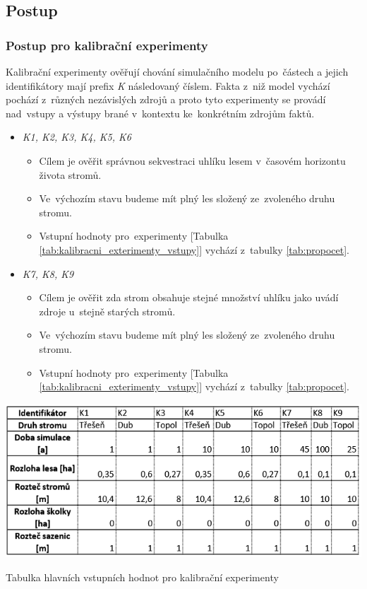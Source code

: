 \documentclass[a4paper, 11pt, titlepage]{article}
\begin{document}
\subsection{Postup}

\subsubsection{Postup pro kalibrační experimenty}

Kalibrační experimenty ověřují chování simulačního modelu po~částech a jejich identifikátory mají prefix \textit{K} následovaný číslem. 
Fakta z~niž model vychází pochází z~různých nezávislých zdrojů a proto tyto experimenty se provádí nad~vstupy a výstupy brané v~kontextu ke~konkrétním zdrojům faktů.
\begin{itemize}
    \item \textit{K1, K2, K3, K4, K5, K6}
    \begin{itemize}
        \item Cílem je ověřit správnou sekvestraci uhlíku lesem v~časovém horizontu života stromů.
        \item Ve~výchozím stavu budeme mít plný les složený ze~zvoleného druhu stromu.
        \item Vstupní hodnoty pro~experimenty [Tabulka \ref{tab:kalibracni_exterimenty_vstupy}] vychází z~tabulky \ref{tab:propocet}.
    \end{itemize}
    \item \textit{K7, K8, K9}
    \begin{itemize}
        \item Cílem je ověřit zda strom obsahuje stejné množství uhlíku jako uvádí zdroje u~stejně starých stromů.
        \item Ve~výchozím stavu budeme mít plný les složený ze~zvoleného druhu stromu.
        \item Vstupní hodnoty pro~experimenty [Tabulka \ref{tab:kalibracni_exterimenty_vstupy}] vychází z~tabulky \ref{tab:propocet}.
    \end{itemize}
\end{itemize}

\begin{table}[htb!]
    \centering
    \includegraphics[scale=0.8]{assets/tab_ke_K1_K9_in.PNG}
    \caption{Tabulka hlavních vstupních hodnot pro kalibrační experimenty}
    \label{tab:kalibracni_exterimenty_vstupy}
\end{table}
\end{document}

